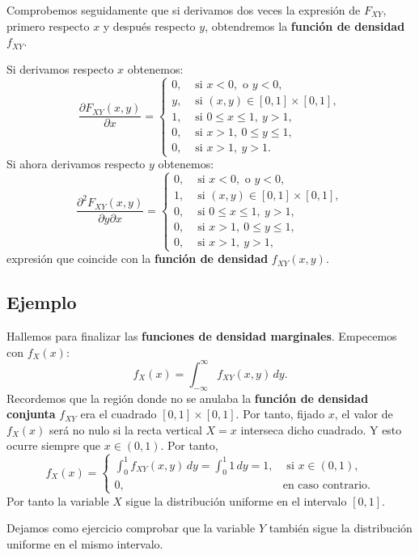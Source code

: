 \documentclass[]{book}
\begin{document}
Comprobemos seguidamente que si derivamos dos veces la expresión de \(F_{XY}\), primero respecto \(x\) y después respecto \(y\), obtendremos la \textbf{función de densidad} \(f_{XY}\).

Si derivamos respecto \(x\) obtenemos:
\[
\frac{\partial F_{XY}(x,y)}{\partial x}=\begin{cases}
0, & \mbox{ si }x<0, \mbox{ o }y<0,\\
y, & \mbox{ si }(x,y)\in [0,1]\times [0,1],\\
1, & \mbox{ si }0\leq x\leq 1,\ y>1,\\
0, & \mbox{ si }x>1,\ 0\leq y\leq 1,\\
0, & \mbox{ si } x>1,\ y>1.
\end{cases}
\]
Si ahora derivamos respecto \(y\) obtenemos:
\[
\frac{\partial^2 F_{XY}(x,y)}{\partial y\partial x}=\begin{cases}
0, & \mbox{ si }x<0, \mbox{ o }y<0,\\
1, & \mbox{ si }(x,y)\in [0,1]\times [0,1],\\
0, & \mbox{ si }0\leq x\leq 1,\ y>1,\\
0, & \mbox{ si }x>1,\ 0\leq y\leq 1,\\
0, & \mbox{ si } x>1,\ y>1,
\end{cases}
\]
expresión que coincide con la \textbf{función de densidad} \(f_{XY}(x,y)\).

\hypertarget{ejemplo-50}{%
\subsection{Ejemplo}\label{ejemplo-50}}

Hallemos para finalizar las \textbf{funciones de densidad marginales}. Empecemos con \(f_X(x)\):
\[
f_X(x)=\int_{-\infty}^\infty  f_{XY}(x,y)\, dy.
\]
Recordemos que la región donde no se anulaba la \textbf{función de densidad conjunta} \(f_{XY}\) era el cuadrado \([0,1]\times [0,1]\). Por tanto, fijado \(x\), el valor de \(f_X(x)\) será no nulo si la recta vertical \(X=x\) interseca dicho cuadrado. Y esto ocurre siempre que \(x\in (0,1)\). Por tanto,
\[
f_X(x)=\begin{cases}
\int_{0}^1  f_{XY}(x,y)\, dy=\int_{0}^1  1\, dy=1, & \mbox{ si }x\in (0,1),\\
0, & \mbox{en caso contrario.}
\end{cases}
\]
Por tanto la variable \(X\) sigue la distribución uniforme en el intervalo \([0,1]\).

Dejamos como ejercicio comprobar que la variable \(Y\) también sigue la distribución uniforme en el mismo intervalo.
\end{document}
